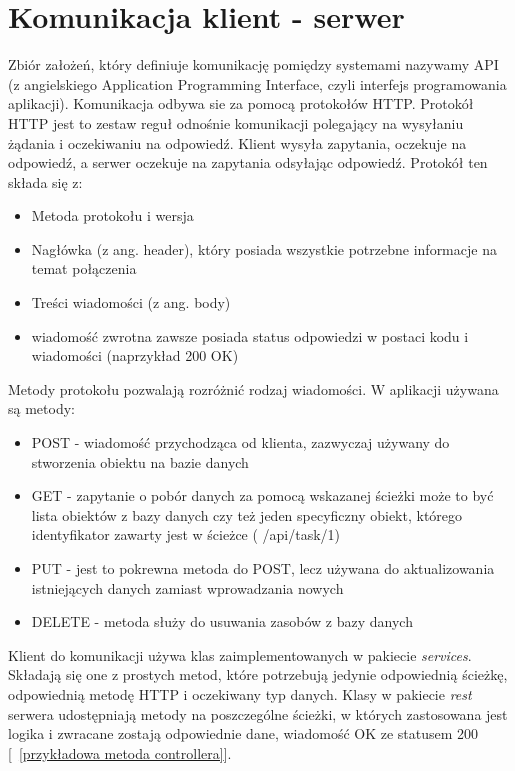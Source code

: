 \section{ Komunikacja klient - serwer}
Zbiór założeń, który definiuje komunikację pomiędzy systemami nazywamy API (z angielskiego Application Programming Interface, czyli interfejs programowania aplikacji).  Komunikacja odbywa sie za pomocą protokołów HTTP. Protokół HTTP jest to zestaw reguł odnośnie komunikacji polegający na wysyłaniu żądania i oczekiwaniu na odpowiedź. Klient wysyła zapytania, oczekuje na odpowiedź, a serwer oczekuje na zapytania odsyłając odpowiedź.%
\newline
Protokół ten składa się z:
\begin{itemize}
	\item Metoda protokołu i wersja
	\item Nagłówka (z ang. header), który posiada wszystkie potrzebne informacje na temat połączenia
	\item Treści wiadomości (z ang. body)
	\item wiadomość zwrotna zawsze posiada status odpowiedzi w postaci kodu i wiadomości (naprzykład 200 OK)
\end{itemize}
Metody protokołu pozwalają rozróżnić rodzaj wiadomości. W aplikacji używana są metody:
\begin{itemize}
	\item POST  - wiadomość przychodząca od klienta, zazwyczaj używany do stworzenia obiektu na bazie danych
	\item GET - zapytanie o pobór danych za pomocą wskazanej ścieżki
	może to być lista obiektów z bazy danych czy też jeden specyficzny obiekt, którego identyfikator zawarty jest w ścieżce ( /api/task/1)
	\item PUT - jest to pokrewna metoda do POST, lecz używana do aktualizowania istniejących danych zamiast wprowadzania nowych
	\item DELETE - metoda służy do usuwania zasobów z bazy danych
\end{itemize}
Klient do komunikacji używa klas zaimplementowanych w pakiecie \textit{services}. Składają się one z prostych metod, które potrzebują jedynie odpowiednią ścieżkę, odpowiednią metodę HTTP i oczekiwany typ danych.
Klasy w pakiecie \textit{rest} serwera udostępniają metody na poszczególne ścieżki, w których zastosowana jest logika i zwracane zostają odpowiednie dane, wiadomość OK ze statusem 200 [~\ref{przykładowa metoda controllera}].

